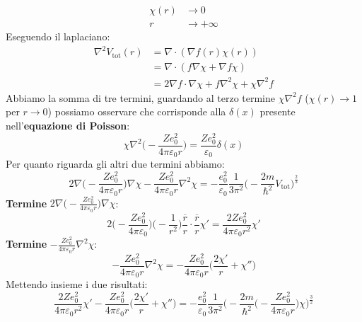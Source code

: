 \begin{equation*}
    \begin{aligned}
        \chi(r) &\rightarrow  0\\
        r &\rightarrow +\infty
        \end{aligned}
\end{equation*}
Eseguendo il laplaciano:
\begin{equation*}
    \begin{aligned}
        \nabla^2V_{\text{tot}}(r) & =\nabla\cdot(\nabla f(r)\chi(r)) \\
        & = \nabla \cdot (f\nabla\chi+\nabla f\chi)\\
        & = 2\nabla f \cdot \nabla \chi + f \nabla^2\chi+\chi\nabla^2 f
    \end{aligned}
\end{equation*}
Abbiamo la somma di tre termini, guardando al terzo termine $\chi\nabla^2 f$ ($\chi(r)\rightarrow 1$ per $r\rightarrow 0$) possiamo osservare che corrisponde alla $\delta(x)$ presente nell'\textbf{equazione di Poisson}:
\begin{equation*}
    \chi\nabla^2\bigg(-\frac{Ze_0^2}{4\pi\varepsilon_0r}\bigg)=\frac{Ze_0^2}{\varepsilon_0}\delta(x)
\end{equation*}
Per quanto riguarda gli altri due termini abbiamo:
\begin{equation*}
    2\nabla\bigg(-\frac{Ze_0^2}{4\pi\varepsilon_0r}\bigg)\nabla\chi-\frac{Ze_0^2}{4\pi\varepsilon_0r}\nabla^2\chi=-\frac{e_0^2}{\varepsilon_0}\frac{1}{3\pi^2}\bigg(-\frac{2m}{\hbar^2}V_{\text{tot}}\bigg)^{\frac23}
\end{equation*}
\textbf{Termine} $2\nabla\bigg(-\frac{Ze_0^2}{4\pi\varepsilon_0r}\bigg)\nabla\chi$:
\begin{equation*}
    2\bigg(-\frac{Ze_0^2}{4\pi\varepsilon_0}\bigg)\bigg(-\frac 1{r^2}\bigg)\frac{\overline r}{r}\cdot\frac{\overline r}{r}\chi'=\frac{2Ze_0^2}{4\pi\varepsilon_0r^2}\chi'
\end{equation*}
\textbf{Termine} $-\frac{Ze_0^2}{4\pi\varepsilon_0r}\nabla^2\chi$:
\begin{equation*}
    -\frac{Ze_0^2}{4\pi\varepsilon_0r}\nabla^2\chi=-\frac{Ze_0^2}{4\pi\varepsilon_0r}\bigg(\frac{2\chi'}{r}+\chi''\bigg)
\end{equation*}
Mettendo insieme i due risultati:
\begin{equation*}
    \frac{2Ze_0^2}{4\pi\varepsilon_0r^2}\chi'-\frac{Ze_0^2}{4\pi\varepsilon_0r}\bigg(\frac{2\chi'}{r}+\chi''\bigg)=-\frac{e_0^2}{\varepsilon_0}\frac{1}{3\pi^2}\bigg(-\frac{2m}{\hbar^2}\bigg(-\frac{Ze_0^2}{4\pi\varepsilon_0r}\bigg)\chi\bigg)^{\frac32}
\end{equation*}
